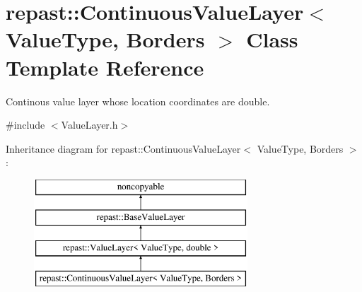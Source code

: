 \hypertarget{classrepast_1_1_continuous_value_layer}{\section{repast\-:\-:Continuous\-Value\-Layer$<$ Value\-Type, Borders $>$ Class Template Reference}
\label{classrepast_1_1_continuous_value_layer}
}


Continous value layer whose location coordinates are double.  




{\ttfamily \#include $<$Value\-Layer.\-h$>$}

Inheritance diagram for repast\-:\-:Continuous\-Value\-Layer$<$ Value\-Type, Borders $>$\-:\begin{figure}[H]
\begin{center}
\leavevmode
\includegraphics[height=4.000000cm]{classrepast_1_1_continuous_value_layer}
\end{center}
\end{figure}
